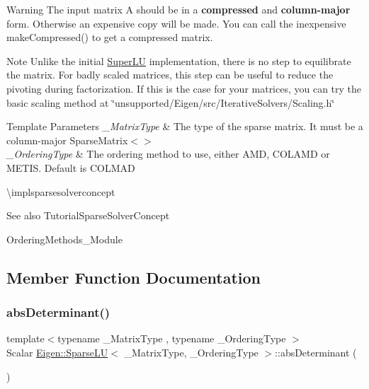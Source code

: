 \begin{DoxyWarning}{Warning}
The input matrix A should be in a {\bfseries{compressed}} and {\bfseries{column-\/major}} form. Otherwise an expensive copy will be made. You can call the inexpensive make\+Compressed() to get a compressed matrix.
\end{DoxyWarning}
\begin{DoxyNote}{Note}
Unlike the initial \mbox{\hyperlink{class_eigen_1_1_super_l_u}{Super\+LU}} implementation, there is no step to equilibrate the matrix. For badly scaled matrices, this step can be useful to reduce the pivoting during factorization. If this is the case for your matrices, you can try the basic scaling method at \char`\"{}unsupported/\+Eigen/src/\+Iterative\+Solvers/\+Scaling.\+h\char`\"{}
\end{DoxyNote}

\begin{DoxyTemplParams}{Template Parameters}
{\em \+\_\+\+Matrix\+Type} & The type of the sparse matrix. It must be a column-\/major Sparse\+Matrix$<$$>$ \\
\hline
{\em \+\_\+\+Ordering\+Type} & The ordering method to use, either A\+MD, C\+O\+L\+A\+MD or M\+E\+T\+IS. Default is C\+O\+L\+M\+AD\\
\hline
\end{DoxyTemplParams}
\textbackslash{}implsparsesolverconcept

\begin{DoxySeeAlso}{See also}
Tutorial\+Sparse\+Solver\+Concept 

Ordering\+Methods\+\_\+\+Module 
\end{DoxySeeAlso}


\subsection{Member Function Documentation}
\mbox{\label{class_eigen_1_1_sparse_l_u_a06fa89424239fb169d408f08252426d0}} 
\subsubsection{\texorpdfstring{absDeterminant()}{absDeterminant()}}
{\footnotesize\ttfamily template$<$typename \+\_\+\+Matrix\+Type , typename \+\_\+\+Ordering\+Type $>$ \\
Scalar \mbox{\hyperlink{class_eigen_1_1_sparse_l_u}{Eigen\+::\+Sparse\+LU}}$<$ \+\_\+\+Matrix\+Type, \+\_\+\+Ordering\+Type $>$\+::abs\+Determinant (\begin{DoxyParamCaption}{ }\end{DoxyParamCaption})\hspace{0.3cm}{\ttfamily [inline]}}

